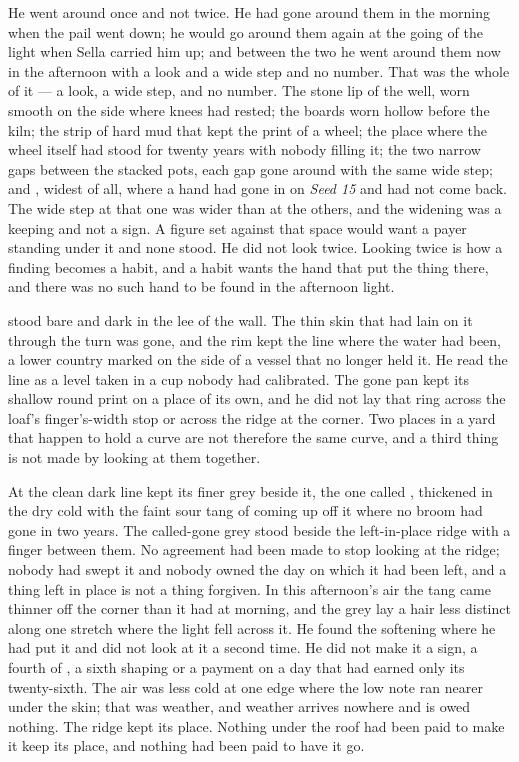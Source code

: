 He went around  once and not twice. He had gone around them in the morning when the pail went down; he would go around them again at the going of the light when Sella carried him up; and between the two he went around them now in the afternoon with a look and a wide step and no number. That was the whole of it --- a look, a wide step, and no number. The stone lip of the well, worn smooth on the side where knees had rested; the boards worn hollow before the kiln; the strip of hard mud that kept the print of a wheel; the place where the wheel itself had stood for twenty years with nobody filling it; the two narrow gaps between the stacked pots, each gap gone around with the same wide step; and , widest of all, where a hand had gone in on \emph{Seed 15} and had not come back. The wide step at that one was wider than at the others, and the widening was a keeping and not a sign. A figure set against that space would want a payer standing under it and none stood. He did not look twice. Looking twice is how a finding becomes a habit, and a habit wants the hand that put the thing there, and there was no such hand to be found in the afternoon light.

\scenebreak

 stood bare and dark in the lee of the wall. The thin skin that had lain on it through the turn was gone, and the rim kept the line where the water had been, a lower country marked on the side of a vessel that no longer held it. He read the line as a level taken in a cup nobody had calibrated. The gone pan kept its shallow round print on a place of its own, and he did not lay that ring across the loaf's finger's-width stop or across the ridge at the corner. Two places in a yard that happen to hold a curve are not therefore the same curve, and a third thing is not made by looking at them together.

At  the clean dark line kept its finer grey beside it, the one called , thickened in the dry cold with the faint sour tang of  coming up off it where no broom had gone in two years. The called-gone grey stood beside the left-in-place ridge with a finger between them. No agreement had been made to stop looking at the ridge; nobody had swept it and nobody owned the day on which it had been left, and a thing left in place is not a thing forgiven. In this afternoon's air the tang came thinner off the corner than it had at morning, and the grey lay a hair less distinct along one stretch where the light fell across it. He found the softening where he had put it and did not look at it a second time. He did not make it a sign, a fourth of , a sixth shaping or a payment on a day that had earned only its twenty-sixth. The air was less cold at one edge where the low note ran nearer under the skin; that was weather, and weather arrives nowhere and is owed nothing. The ridge kept its place. Nothing under the roof had been paid to make it keep its place, and nothing had been paid to have it go.

